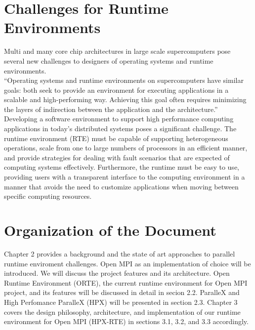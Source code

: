 \section{Challenges for Runtime Environments}
Multi and many core chip architectures in large scale supercomputers pose several new challenges to designers of operating systems and runtime environments.\\
``Operating systems and runtime environments on supercomputers have similar goals: both seek to provide an environment for executing applications in a scalable and high-performing way. Achieving this goal often requires minimizing the layers of indirection between the application and the architecture.''~\cite{Hoefler:2012:OSR:2237840.2237848}\\
Developing a software environment to support high performance computing applications in today's distributed systems poses a significant challenge. The runtime environment (RTE) must be capable of supporting heterogeneous operations, scale from one to large numbers of processors in an efficient manner, and provide strategies for dealing with fault scenarios that are expected of computing systems effectively. Furthermore, the runtime must be easy to use, providing users with a transparent interface to the computing environment in a manner that avoids the need to customize applications when moving between specific computing resources.~\cite{Castain2008153}

\section{Organization of the Document}
Chapter 2 provides a background and the state of art approaches to parallel runtime enviroment challenges. Open MPI as an implementation of choice will be introduced. We will discuss the project features and its architecture. Open Runtime Environment (ORTE), the current runtime environment for Open MPI project, and its features will be discussed in detail in secion 2.2. ParalleX and High Perfomance ParalleX (HPX) will be presented in section 2.3. Chapter 3 covers the design philosophy, architecture, and implementation of our runtime environment for Open MPI (HPX-RTE) in sections 3.1, 3.2, and 3.3 accordingly.

